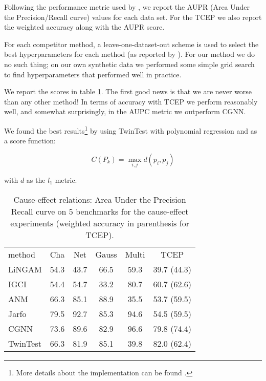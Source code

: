 Following the performance metric used by \cite{goudet2017causal}, we report the AUPR (Area Under the Precision/Recall curve)
values for each data set. For the TCEP we also report the weighted accuracy along with the AUPR score. 

For each  competitor method, a leave-one-dataset-out scheme 
is used to select the best hyperparameters for each method (as reported by \cite{goudet2017causal}). For 
our method we do no such thing; on our own synthetic data we performed some simple grid search to find 
hyperparameters that performed well in practice. 

We report the scores in table \ref{tab:AUPR}. The first good news is that we are never worse than any other 
method! In terms of accuracy with TCEP we perform reasonably well, and somewhat surprisingly, in the  
AUPC metric we outperform CGNN. 

We found the best results\footnote{More details about the implementation can be found 
\href{https://github.com/Nacho114/bivariate-causal-inference}{\color{blue}{here}}.}
 by using TwinTest with polynomial regression and as a score function:

$$
    C(P_k) = \operatorname{max}_{i, j} d(p_i, p_j)
$$

with $d$ as the $l_1$ metric. 




\begin{table}[H]
    \centering


    \begin{tabular}{lccccc}
        \hline method & Cha & Net & Gauss & Multi & TCEP \\
        LiNGAM & 54.3 & 43.7 & 66.5 & 59.3 & 39.7 (44.3) \\
        IGCI & 54.4 & 54.7 & 33.2 & 80.7 & 60.7 (62.6) \\
        ANM & 66.3 & 85.1 & 88.9 & 35.5 & 53.7 (59.5) \\
        Jarfo & 79.5 & 92.7 & 85.3 & 94.6 & 54.5 (59.5) \\
        CGNN  & 73.6 & 89.6 & 82.9 & 96.6 & 79.8 (74.4) \\
        \hline TwinTest & 66.3 & 81.9 & 85.1 & 39.8 & 82.0 (62.4) \\
        \hline
    \end{tabular}

    \caption{Cause-effect relations: Area Under the Precision Recall curve
     on 5 benchmarks for the cause-effect experiments (weighted accuracy 
     in parenthesis for TCEP).}   
    \label{tab:AUPR}
\end{table}


